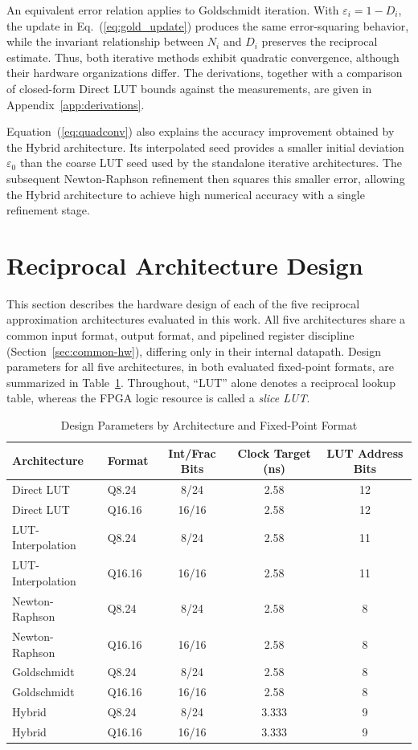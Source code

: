 \documentclass[manuscript,screen,review]{acmart}
\begin{document}
An equivalent error relation applies to Goldschmidt iteration. With $\varepsilon_i = 1 - D_i$, the update in Eq.~(\ref{eq:gold_update}) produces the same error-squaring behavior, while the invariant relationship between $N_i$ and $D_i$ preserves the reciprocal estimate. Thus, both iterative methods exhibit quadratic convergence, although their hardware organizations differ. The derivations, together with a comparison of closed-form Direct LUT bounds against the measurements, are given in Appendix~\ref{app:derivations}.

Equation~(\ref{eq:quadconv}) also explains the accuracy improvement obtained by the Hybrid architecture. Its interpolated seed provides a smaller initial deviation $\varepsilon_0$ than the coarse LUT seed used by the standalone iterative architectures. The subsequent Newton-Raphson refinement then squares this smaller error, allowing the Hybrid architecture to achieve high numerical accuracy with a single refinement stage.

\section{Reciprocal Architecture Design}
\label{sec:design}

This section describes the hardware design of each of the five reciprocal approximation architectures evaluated in this work. All five architectures share a common input format, output format, and pipelined register discipline (Section~\ref{sec:common-hw}), differing only in their internal datapath. Design parameters for all five architectures, in both evaluated fixed-point formats, are summarized in Table~\ref{tab:designparams}. Throughout, ``LUT'' alone denotes a reciprocal lookup table, whereas the FPGA logic resource is called a \emph{slice LUT}.

\begin{table}[H]
\caption{Design Parameters by Architecture and Fixed-Point Format}
\label{tab:designparams}
\begin{tabular}{@{}llccc@{}}
\toprule
\textbf{Architecture} & \textbf{Format} & \textbf{Int/Frac Bits} & \textbf{Clock Target (ns)} & \textbf{LUT Address Bits} \\
\midrule
Direct LUT & Q8.24 & 8/24 & 2.58 & 12 \\
Direct LUT & Q16.16 & 16/16 & 2.58 & 12 \\
LUT-Interpolation & Q8.24 & 8/24 & 2.58 & 11 \\
LUT-Interpolation & Q16.16 & 16/16 & 2.58 & 11 \\
Newton-Raphson & Q8.24 & 8/24 & 2.58 & 8 \\
Newton-Raphson & Q16.16 & 16/16 & 2.58 & 8 \\
Goldschmidt & Q8.24 & 8/24 & 2.58 & 8 \\
Goldschmidt & Q16.16 & 16/16 & 2.58 & 8 \\
Hybrid & Q8.24 & 8/24 & 3.333 & 9 \\
Hybrid & Q16.16 & 16/16 & 3.333 & 9 \\
\bottomrule
\end{tabular}
\end{table}
\end{document}
